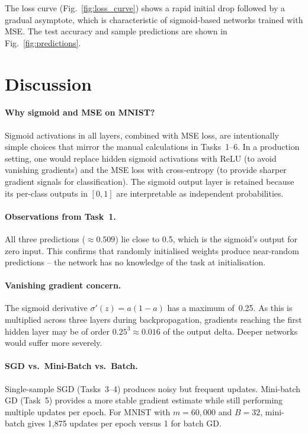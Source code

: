 \documentclass[runningheads]{llncs}
\begin{document}
The loss curve (Fig.~\ref{fig:loss_curve}) shows a rapid initial drop followed
by a gradual asymptote, which is characteristic of sigmoid-based networks
trained with MSE. The test accuracy and sample predictions are shown in
Fig.~\ref{fig:predictions}.

\section{Discussion}
\label{sec:discussion}

\paragraph{Why sigmoid and MSE on MNIST?}
Sigmoid activations in all layers, combined with MSE loss, are intentionally
simple choices that mirror the manual calculations in Tasks~1--6. In a
production setting, one would replace hidden sigmoid activations with ReLU
(to avoid vanishing gradients) and the MSE loss with cross-entropy (to
provide sharper gradient signals for classification). The sigmoid output layer
is retained because its per-class outputs in $[0,1]$ are interpretable as
independent probabilities.

\paragraph{Observations from Task~1.}
All three predictions ($\approx 0.509$) lie close to 0.5, which is the sigmoid's
output for zero input. This confirms that randomly initialised weights produce
near-random predictions -- the network has no knowledge of the task at
initialisation.

\paragraph{Vanishing gradient concern.}
The sigmoid derivative $\sigma'(z) = a(1-a)$ has a maximum of~0.25. As this is
multiplied across three layers during backpropagation, gradients reaching the
first hidden layer may be of order $0.25^3 \approx 0.016$ of the output delta.
Deeper networks would suffer more severely.

\paragraph{SGD vs.\ Mini-Batch vs.\ Batch.}
Single-sample SGD (Tasks~3--4) produces noisy but frequent updates. Mini-batch
GD (Task~5) provides a more stable gradient estimate while still performing
multiple updates per epoch. For MNIST with $m=60{,}000$ and $B=32$, mini-batch
gives 1{,}875 updates per epoch versus 1 for batch GD.
\end{document}
